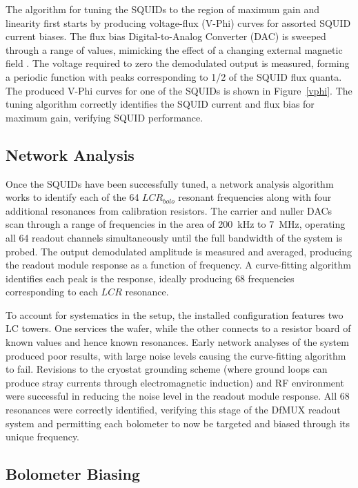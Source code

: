 \documentclass[iop]{emulateapj}
\begin{document}
The algorithm for tuning the SQUIDs to the region of maximum gain and linearity first starts by producing voltage-flux (V-Phi) curves for assorted SQUID current biases.  The flux bias Digital-to-Analog Converter (DAC) is sweeped through a range of values, mimicking the effect of a changing external magnetic field \citep{bender_digital_2014}.  The voltage required to zero the demodulated output is measured, forming a periodic function with peaks corresponding to 1/2 of the SQUID flux quanta.  The produced V-Phi curves for one of the SQUIDs is shown in Figure~\ref{vphi}.  The tuning algorithm correctly identifies the SQUID current and flux bias for maximum gain, verifying SQUID performance.


\subsection{Network Analysis}

Once the SQUIDs have been successfully tuned, a network analysis algorithm works to identify each of the 64 $LCR_{bolo}$ resonant frequencies along with four additional resonances from calibration resistors.  The carrier and nuller DACs scan through a range of frequencies in the area of 200~kHz to 7~MHz, operating all 64 readout channels simultaneously until the full bandwidth of the system is probed.  The output demodulated amplitude is measured and averaged, producing the readout module response as a function of frequency.  A curve-fitting algorithm identifies each peak is the response, ideally producing 68 frequencies corresponding to each $LCR$ resonance.  

To account for systematics in the setup, the installed configuration features two LC towers.  One services the wafer, while the other connects to a resistor board of known values and hence known resonances.  Early network analyses of the system produced poor results, with large noise levels causing the curve-fitting algorithm to fail.  Revisions to the cryostat grounding scheme (where ground loops can produce stray currents through electromagnetic induction) and RF environment were successful in reducing the noise level in the readout module response.  All 68 resonances were correctly identified, verifying this stage of the DfMUX readout system and permitting each bolometer to now be targeted and biased through its unique frequency.

\subsection{Bolometer Biasing}
\end{document}
